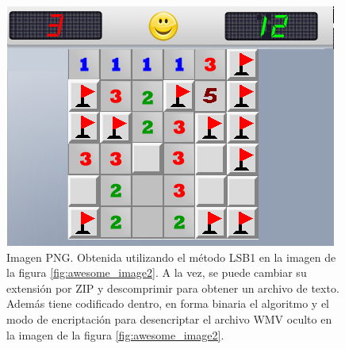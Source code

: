 \documentclass[a4paper,10pt]{article}
\begin{document}
 
\begin{figure}[!htb]
\begin{center}
%
 \includegraphics[scale=0.5]{./images/miserables2-out.png}
  \caption{Imagen PNG. Obtenida utilizando el método LSB1 en la imagen de la figura \ref{fig:awesome_image2}. A la vez, se puede cambiar su extensión por ZIP y 
    descomprimir para obtener un archivo de texto. Además tiene codificado dentro, en forma binaria el algoritmo y el modo de encriptación para desencriptar
    el archivo WMV oculto en la imagen de la figura \ref{fig:awesome_image2}.}\label{fig:awesome_image5}
\endminipage
\end{center}
\end{figure}
\end{document}
